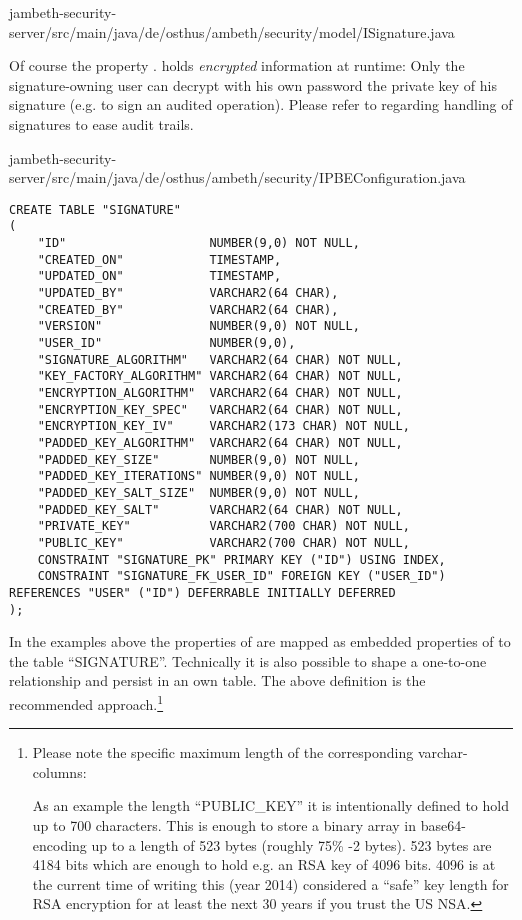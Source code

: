 	{jambeth-security-server/src/main/java/de/osthus/ambeth/security/model/ISignature.java}

Of course the property . holds \emph{encrypted} information at runtime: Only the signature-owning user can decrypt with his own password the private key of his signature (e.g. to sign an audited operation). Please refer to  regarding handling of signatures to ease audit trails.

	{jambeth-security-server/src/main/java/de/osthus/ambeth/security/IPBEConfiguration.java}

\begin{lstlisting}[style=SQL-Oracle,caption={Example schema definition to persist the \AMBETH{} \type{ISignature}-entity (Oracle SQL)}]
CREATE TABLE "SIGNATURE"
(	
	"ID"         			NUMBER(9,0) NOT NULL,
	"CREATED_ON" 			TIMESTAMP,
	"UPDATED_ON" 			TIMESTAMP,
	"UPDATED_BY" 			VARCHAR2(64 CHAR),
	"CREATED_BY" 			VARCHAR2(64 CHAR),
	"VERSION"    			NUMBER(9,0) NOT NULL,
	"USER_ID"				NUMBER(9,0),
	"SIGNATURE_ALGORITHM"	VARCHAR2(64 CHAR) NOT NULL,
	"KEY_FACTORY_ALGORITHM"	VARCHAR2(64 CHAR) NOT NULL,
	"ENCRYPTION_ALGORITHM"	VARCHAR2(64 CHAR) NOT NULL,
	"ENCRYPTION_KEY_SPEC"	VARCHAR2(64 CHAR) NOT NULL,
	"ENCRYPTION_KEY_IV"		VARCHAR2(173 CHAR) NOT NULL,
	"PADDED_KEY_ALGORITHM"	VARCHAR2(64 CHAR) NOT NULL,
	"PADDED_KEY_SIZE"		NUMBER(9,0) NOT NULL,
	"PADDED_KEY_ITERATIONS"	NUMBER(9,0) NOT NULL,
	"PADDED_KEY_SALT_SIZE"	NUMBER(9,0) NOT NULL,
	"PADDED_KEY_SALT"		VARCHAR2(64 CHAR) NOT NULL,
	"PRIVATE_KEY"			VARCHAR2(700 CHAR) NOT NULL,
	"PUBLIC_KEY"			VARCHAR2(700 CHAR) NOT NULL,
	CONSTRAINT "SIGNATURE_PK" PRIMARY KEY ("ID") USING INDEX,
	CONSTRAINT "SIGNATURE_FK_USER_ID" FOREIGN KEY ("USER_ID") REFERENCES "USER" ("ID") DEFERRABLE INITIALLY DEFERRED
);
\end{lstlisting}
In the examples above the properties of  are mapped as embedded properties of  to the table ``SIGNATURE''. Technically it is also possible to shape a one-to-one relationship and persist  in an own table. The above definition is the recommended approach.\footnote{Please note the specific maximum length of the corresponding varchar-columns:\newline

As an example the length ``PUBLIC\_KEY'' it is intentionally defined to hold up to 700 characters. This is enough to store a binary array in base64-encoding up to a length of 523 bytes (roughly 75\% -2 bytes). 523 bytes are 4184 bits which are enough to hold e.g. an RSA key of 4096 bits. 4096 is at the current time of writing this (year 2014) considered a ``safe'' key length for RSA encryption for at least the next 30 years if you trust the US NSA\cite{nsa01}.}\newline



